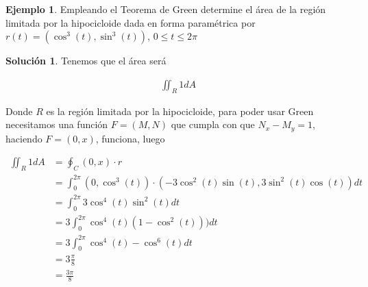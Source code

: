 \documentclass{article}
\theoremstyle{plain}
\theoremstyle{definition}
\newtheorem{ejem}[thm]{Ejemplo}
\newtheorem{sol}[thm]{Solución}
\begin{document}
\begin{ejem}Empleando el Teorema de Green determine el área de la región limitada por la hipocicloide dada en forma paramétrica por $r(t) =(\cos^3(t),\sin^3(t))$, $0 \leq t \leq 2\pi$ \\
\end{ejem}

\begin{sol}Tenemos que el área será
\end{sol}

\begin{align*}
    \iint_R 1 dA
\end{align*}

Donde $R$ es la región limitada por la hipocicloide, para poder usar Green necesitamos una función $F=(M,N)$ que cumpla con que $N_x-M_y=1$, haciendo $F=(0,x)$, funciona, luego

\begin{align*}
    \iint_R 1 dA &=  \oint_C (0,x) \cdot r \\
    &=  \int_0^{2\pi} (0,\cos^3(t)) \cdot (-3\cos^2(t)\sin(t),3\sin^2(t)\cos(t)) dt\\
    &=  \int_0^{2\pi} 3\cos^4(t)\sin^2(t)dt\\
    &=  3\int_0^{2\pi} \cos^4(t)(1-\cos^2(t)))dt\\
    &=  3\int_0^{2\pi} \cos^4(t)-\cos^6(t)dt\\
    &= 3 \frac{\pi}{8} \\
    &= \frac{3\pi}{8} \\
\end{align*}
\end{document}
